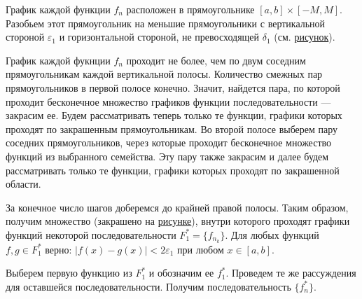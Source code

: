 \documentclass{article}
\begin{document}
График каждой функции $f_n$ расположен в прямоугольнике $[a,b] \times [-M, M]$. Разобьем этот прямоугольник на меньшие прямоугольники с вертикальной стороной $\varepsilon_1$ и горизонтальной стороной, не превосходящей $\delta_1$ (см. \hyperref[squares]{рисунок}).

\begin{figure}[h!]\label{squares}
\end{figure}

График каждой фукнции $f_n$ проходит не более, чем по двум соседним прямоугольникам каждой вертикальной полосы. Количество смежных пар прямоугольников в первой полосе конечно. Значит, найдется пара, по которой проходит бесконечное множество графиков функции последовательности --- закрасим ее. Будем рассматривать теперь только те функции, графики которых проходят по закрашенным прямоугольникам. Во второй полосе выберем пару соседних прямоугольников, через которые проходит бесконечное множество функций из выбранного семейства. Эту пару также закрасим и далее будем рассматривать только те функции, графики которых проходят по закрашенной области.

За конечное число шагов доберемся до крайней правой полосы. Таким образом, получим множество (закрашено на \hyperref[squares]{рисунке}), внутри которого проходят графики функций некоторой последовательности $F_1^{*} = \{f_{n_k}\}$. Для любых функций $f, g \in F_1^{*}$ верно: $|f(x) - g(x)| < 2\varepsilon_1$ при любом $x \in [a,b]$.

Выберем первую функцию из $F_1^{*}$ и обозначим ее $f_1^{*}$. Проведем те же рассуждения для оставшейся последовательности. Получим последовательность $\{f_n^{*}\}$.
\end{document}
